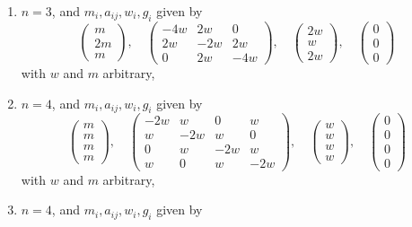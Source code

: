 \begin{lemma}
\begin{enumerate}
$$\begin{matrix}
0 \\
0
\end{matrix}
\right)
$$
with $w$ and $m$ arbitrary,
\item
\label{models-item-down-up}
$n = 3$, and $m_i, a_{ij}, w_i, g_i$ given by
$$
\left(
\begin{matrix}
m \\
2m \\
m
\end{matrix}
\right),
\quad
\left(
\begin{matrix}
-4w & 2w & 0 \\
2w & -2w & 2w \\
0 & 2w & -4w
\end{matrix}
\right),
\quad
\left(
\begin{matrix}
2w \\
w \\
2w
\end{matrix}
\right),
\quad
\left(
\begin{matrix}
0 \\
0 \\
0
\end{matrix}
\right)
$$
with $w$ and $m$ arbitrary,
\item
\label{models-item-four-cycle}
$n = 4$, and $m_i, a_{ij}, w_i, g_i$ given by
$$
\left(
\begin{matrix}
m \\
m \\
m \\
m
\end{matrix}
\right),
\quad
\left(
\begin{matrix}
-2w & w & 0 & w \\
w & -2w & w & 0 \\
0 & w & -2w & w \\
w & 0 & w & -2w
\end{matrix}
\right),
\quad
\left(
\begin{matrix}
w \\
w \\
w \\
w
\end{matrix}
\right),
\quad
\left(
\begin{matrix}
0 \\
0 \\
0 \\
0
\end{matrix}
\right)
$$
with $w$ and $m$ arbitrary,
\item
\label{models-item-up-equal-up}
$n = 4$, and $m_i, a_{ij}, w_i, g_i$ given by

\end{enumerate}
\end{lemma}
